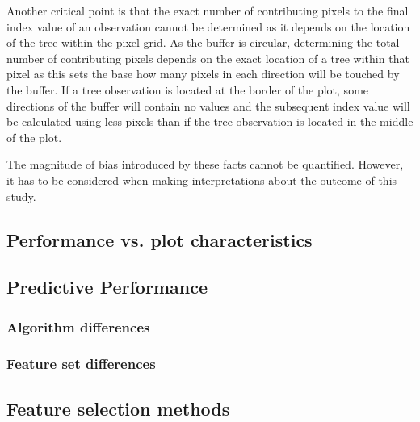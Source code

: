 \documentclass[letterpaper, journal]{IEEEtran}
\begin{document}
Another critical point is that the exact number of contributing pixels to the final index value of an observation cannot be determined as it depends on the location of the tree within the pixel grid.
As the buffer is circular, determining the total number of contributing pixels depends on the exact location of a tree within that pixel as this sets the base how many pixels in each direction will be touched by the buffer.
If a tree observation is located at the border of the plot, some directions of the buffer will contain no values and the subsequent index value will be calculated using less pixels than if the tree observation is located in the middle of the plot.

The magnitude of bias introduced by these facts cannot be quantified.
However, it has to be considered when making interpretations about the outcome of this study.

\subsection{Performance vs. plot characteristics}

\subsection{Predictive Performance}

\subsubsection{Algorithm differences}

\subsubsection{Feature set differences}

\subsection{Feature selection methods}

\end{document}
